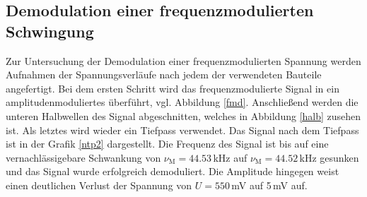 \subsection{Demodulation einer frequenzmodulierten Schwingung}
Zur Untersuchung der Demodulation einer frequenzmodulierten Spannung werden
Aufnahmen der Spannungsverläufe nach jedem der verwendeten Bauteile angefertigt.
Bei dem ersten Schritt wird das frequenzmodulierte Signal in ein
amplitudenmoduliertes überführt, vgl. Abbildung \ref{fmd}. Anschließend
werden die unteren Halbwellen des Signal abgeschnitten, welches in Abbildung
\ref{halb} zusehen ist. Als letztes wird wieder ein Tiefpass verwendet.
Das Signal nach dem Tiefpass ist in der Grafik \ref{ntp2} dargestellt.
Die Frequenz des Signal ist bis auf eine vernachlässigebare Schwankung
von  $\nu_\text{M}=44.53\,$kHz auf $\nu_\text{M}=44.52\,$kHz gesunken und
das Signal wurde erfolgreich demoduliert. Die Amplitude
hingegen weist einen deutlichen Verlust der Spannung von $U=550\,$mV auf 5$\,$mV auf.



